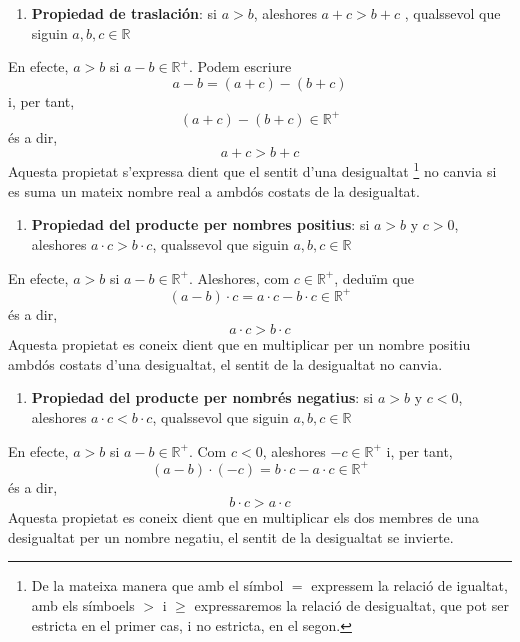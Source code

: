 \begin{enumerate}
\item[5.] \textbf{Propiedad de traslación}: si $a>b$, aleshores $a+c>b+c$%
, qualssevol que siguin $a,b,c\in \mathbb{R}$
\end{enumerate}

En efecte, $a>b$ si $a-b\in \mathbb{R}^{+}$. Podem escriure%
\begin{equation*}
a-b=(a+c)-(b+c)
\end{equation*}%
i, per tant,%
\begin{equation*}
(a+c)-(b+c)\in \mathbb{R}^{+}
\end{equation*}%
és a dir,%
\begin{equation*}
a+c>b+c
\end{equation*}%
Aquesta propietat s’expressa dient que el sentit d’una desigualtat%
\footnote{%
De la mateixa manera que amb el símbol $=$ expressem la relació de
igualtat, amb els símboels $>$ i $\geq$ expressaremos la relació
de desigualtat, que pot ser estricta en el primer cas, i no estricta, en
el segon.} no canvia si es suma un mateix nombre real a ambdós costats de
la desigualtat.

\begin{enumerate}
\item[6.] \textbf{Propiedad del producte per nombres positius}: si $a>b$
y $c>0$, aleshores $a\cdot c>b\cdot c$, qualssevol que siguin $a,b,c\in 
\mathbb{R}$
\end{enumerate}

En efecte, $a>b$ si $a-b\in \mathbb{R}^{+}$. Aleshores, com $c\in \mathbb{R}%
^{+}$, deduïm que%
\begin{equation*}
(a-b)\cdot c=a\cdot c-b\cdot c\in \mathbb{R}^{+}
\end{equation*}%
és a dir,%
\begin{equation*}
a\cdot c>b\cdot c
\end{equation*}%
Aquesta propietat es coneix dient que en multiplicar per un nombre
positiu ambdós costats d’una desigualtat, el sentit de la desigualtat no
canvia.

\begin{enumerate}
\item[7.] \textbf{Propiedad del producte per nombrés negatius}: si $a>b$
y $c<0$, aleshores $a\cdot c<b\cdot c$, qualssevol que siguin $a,b,c\in 
\mathbb{R}$
\end{enumerate}

En efecte, $a>b$ si $a-b\in \mathbb{R}^{+}$. Com $c<0$, aleshores $-c\in 
\mathbb{R}^{+}$ i, per tant,%
\begin{equation*}
(a-b)\cdot (-c)=b\cdot c-a\cdot c\in \mathbb{R}^{+}
\end{equation*}%
és a dir,%
\begin{equation*}
b\cdot c>a\cdot c
\end{equation*}%
Aquesta propietat es coneix dient que en multiplicar els dos membres de
una desigualtat per un nombre negatiu, el sentit de la desigualtat se
invierte.

